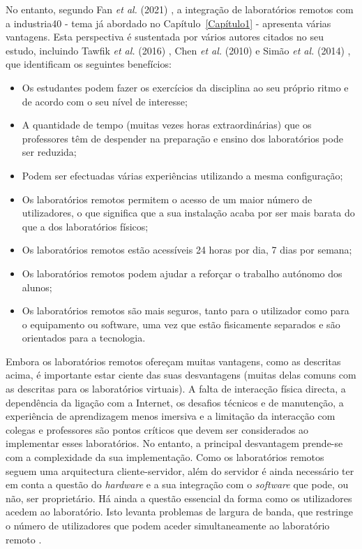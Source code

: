 No entanto, segundo Fan \textit{et al.} (2021) \cite{EvaluationRemoteVirtualE-Learning}, a integração de laboratórios remotos com a \gls{industria40} - tema já abordado no Capítulo~\ref{Capítulo1} - apresenta várias vantagens. Esta perspectiva é sustentada por vários autores citados no seu estudo, incluindo Tawfik \textit{et al.} (2016) \cite{RemoteLabsImpactVISIR}, Chen \textit{et al.} (2010) \cite{DevelopingVirtualAndRemoteUndergraduate} e Simão \textit{et al.} (2014) \cite{RemoteLabsDevelopingCountries}, que identificam os seguintes benefícios:
\begin{itemize}
    \item Os estudantes podem fazer os exercícios da disciplina ao seu próprio ritmo e de acordo com o seu nível de interesse;
    \item A quantidade de tempo (muitas vezes horas extraordinárias) que os professores têm de despender na preparação e ensino dos laboratórios pode ser reduzida;
    \item Podem ser efectuadas várias experiências utilizando a mesma configuração;
    \item Os laboratórios remotos permitem o acesso de um maior número de utilizadores, o que significa que a sua instalação acaba por ser mais barata do que a dos laboratórios físicos;
    \item Os laboratórios remotos estão acessíveis 24 horas por dia, 7 dias por semana;
    \item Os laboratórios remotos podem ajudar a reforçar o trabalho autónomo dos alunos;
    \item Os laboratórios remotos são mais seguros, tanto para o utilizador como para o equipamento ou software, uma vez que estão fisicamente separados e são orientados para a tecnologia.
\end{itemize}

Embora os laboratórios remotos ofereçam muitas vantagens, como as descritas acima, é importante estar ciente das suas desvantagens (muitas delas comuns com as descritas para os laboratórios virtuais). A falta de interacção física directa, a dependência da ligação com a Internet, os desafios técnicos e de manutenção, a experiência de aprendizagem menos imersiva e a limitação da interacção com colegas e professores são pontos críticos que devem ser considerados ao implementar esses laboratórios. No entanto, a principal desvantagem prende-se com a complexidade da sua implementação. Como os laboratórios remotos seguem uma arquitectura cliente-servidor, além do servidor é ainda necessário ter em conta a questão do \textit{hardware} e a sua integração com o \textit{software} que pode, ou não, ser proprietário. Há ainda a questão essencial da forma como os utilizadores acedem ao laboratório. Isto levanta problemas de largura de banda, que restringe o número de utilizadores que podem aceder simultaneamente ao laboratório remoto \cite{HERADIO20161}.


